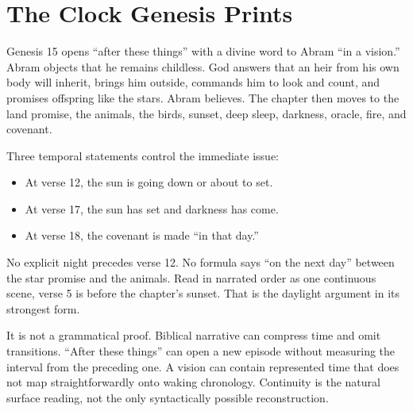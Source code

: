 \section{The Clock Genesis Prints}

Genesis 15 opens ``after these things'' with a divine word to Abram ``in a
vision.'' Abram objects that he remains childless. God answers that an heir
from his own body will inherit, brings him outside, commands him to look and
count, and promises offspring like the stars. Abram believes. The chapter then
moves to the land promise, the animals, the birds, sunset, deep sleep, darkness,
oracle, fire, and covenant.

Three temporal statements control the immediate issue:

\begin{itemize}
\item At verse 12, the sun is going down or about to set.
\item At verse 17, the sun has set and darkness has come.
\item At verse 18, the covenant is made ``in that day.''
\end{itemize}

No explicit night precedes verse 12. No formula says ``on the next day'' between
the star promise and the animals. Read in narrated order as one continuous
scene, verse 5 is before the chapter's sunset. That is the daylight argument in
its strongest form.

It is not a grammatical proof. Biblical narrative can compress time and omit
transitions. ``After these things'' can open a new episode without measuring
the interval from the preceding one. A vision can contain represented time
that does not map straightforwardly onto waking chronology. Continuity is the
natural surface reading, not the only syntactically possible reconstruction.

